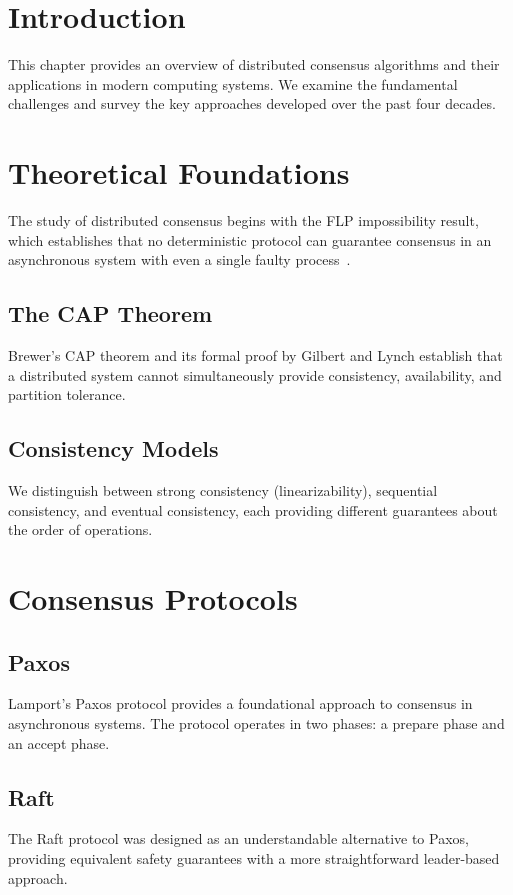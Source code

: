 \documentclass[
    language=english,
    doctype=book-chapter,
    institution=none,
]{../../omnilatex}
\begin{document}
\section{Introduction}
This chapter provides an overview of distributed consensus algorithms
and their applications in modern computing systems.  We examine the
fundamental challenges and survey the key approaches developed over
the past four decades.

\section{Theoretical Foundations}
The study of distributed consensus begins with the FLP impossibility
result, which establishes that no deterministic protocol can guarantee
consensus in an asynchronous system with even a single faulty
process~\cite{bibid}.

\subsection{The CAP Theorem}
Brewer's CAP theorem and its formal proof by Gilbert and Lynch establish
that a distributed system cannot simultaneously provide consistency,
availability, and partition tolerance.

\subsection{Consistency Models}
We distinguish between strong consistency (linearizability), sequential
consistency, and eventual consistency, each providing different
guarantees about the order of operations.

\section{Consensus Protocols}

\subsection{Paxos}
Lamport's Paxos protocol provides a foundational approach to consensus
in asynchronous systems.  The protocol operates in two phases: a
prepare phase and an accept phase.

\subsection{Raft}
The Raft protocol was designed as an understandable alternative to Paxos,
providing equivalent safety guarantees with a more straightforward
leader-based approach.
\end{document}
